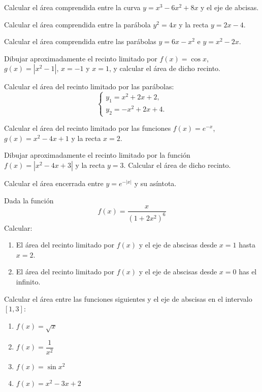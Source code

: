 
{Calcular el área comprendida entre la curva $y=x^{3}-6x^{2}+8x$ y el eje de abcisas.
}


{Calcular el área comprendida entre la parábola $y^{2}=4x$ y la recta $y=2x-4$.
}


{Calcular el área comprendida entre las parábolas $y=6x-x^{2}$ e $y=x^{2}-2x.$
}


{Dibujar aproximadamente el recinto limitado por $f(x)=\cos x$, $g(x)=|x^2-1|$, $x=-1$ y $x=1$, y calcular el área de dicho recinto. 
}


{Calcular el área del recinto limitado por las parábolas:
\[
\left\{
\begin{array}{l}
y_1 = x^2+2x+2,\\
y_2 = -x^2+2x+4.
\end{array}
\right.
\]
}


{Calcular el área del recinto limitado por las funciones $f(x)= e^{-x}$, $g(x)=x^2-4x+1$ y la recta $x=2$.
}


{Dibujar aproximadamente el recinto limitado por la función $f(x)=\left| x^{2}-4x+3\right|$ y la recta $y=3.$ Calcular el área de dicho recinto.
}


{Calcular el área encerrada entre $y=e^{-\left|x\right| }$ y su asíntota.
}


{Dada la función 
\[
f(x)=\frac{x}{(1+2x^2)^6}
\]
Calcular:
\begin{enumerate}
\item El área del recinto limitado por $f(x)$ y el eje de abscisas desde $x=1$ hasta $x=2$.
\item El área del recinto limitado por $f(x)$ y el eje de abscisas desde $x=0$ has el infinito.
\end{enumerate}
}


{Calcular el área entre las funciones siguientes y el eje de abscisas en el intervalo $[1,3]$:
\begin{multicols}{2}
\begin{enumerate}\setlength{\itemsep}{3mm}
\item $f(x)=\sqrt{x}$
\item $f(x)=\dfrac{1}{x^2}$
\item $f(x)=\sin x^2$
\item $f(x)=x^2-3x+2$
\end{enumerate}
\end{multicols}
}



